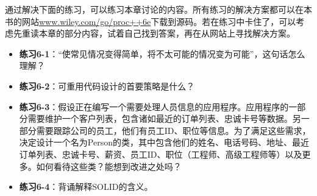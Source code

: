 通过解决下面的练习，可以练习本章讨论的内容。所有练习的解决方案都可以在本书的网站\url{www.wiley.com/go/proc++6e}下载到源码。若在练习中卡住了，可以考虑先重读本章的部分内容，试着自己找到答案，再在从网站上寻找解决方案。

\begin{itemize}
\item
\textbf{练习6-1}：“使常见情况变得简单，将不太可能的情况变为可能”，这句话怎么理解？

\item
\textbf{练习6-2}：可重用代码设计的首要策略是什么？

\item
\textbf{练习6-3}：假设正在编写一个需要处理人员信息的应用程序。应用程序的一部分需要维护一个客户列表，包含诸如最近的订单列表、忠诚卡号等数据。另一部分需要跟踪公司的员工，他们有员工ID、职位等信息。为了满足这些需求，决定设计一个名为Person的类，其中包含他们的姓名、电话号码、地址、最近订单列表、忠诚卡号、薪资、员工ID、职位（工程师、高级工程师等）以及更多。如何看待这些类？能想到改进之处吗？

\item
\textbf{练习6-4}：背诵解释SOLID的含义。
\end{itemize}